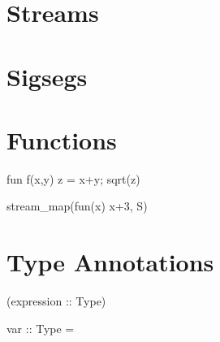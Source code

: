 

\section{Streams}

\section{Sigsegs}

\section{Functions}

\begin{code}
fun f(x,y) {
  z = x+y;
  sqrt(z)
}
\end{code}

\begin{code}
stream_map(fun(x) x+3, S)
\end{code}

\section{Type Annotations}

\begin{code}
f :: Type;
fun f(x,y) { ...
\end{code}

\begin{code}
(expression :: Type)
\end{code}

\begin{code}
var :: Type = 
\end{code}










  




